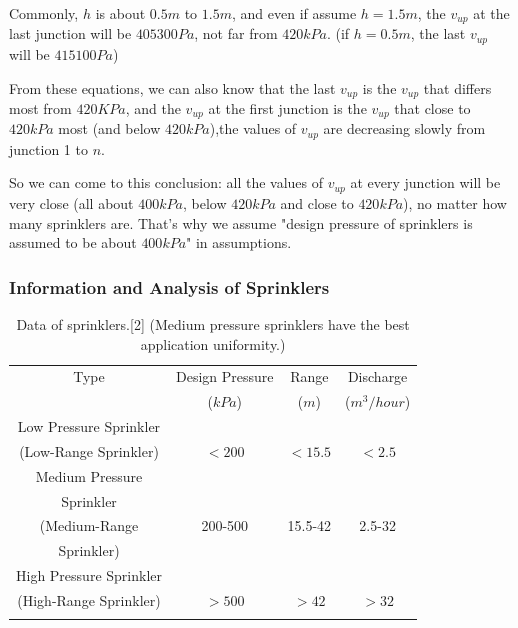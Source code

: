 \documentclass[12pt,a4paper,titlepage]{article}
\begin{document}
Commonly, $h$ is about $0.5m$ to $1.5m$, and even if assume
$h=1.5m$, the $v_{up}$ at the last junction will be $405300Pa$,
not far from $420kPa$. (if $h=0.5m$, the last $v_{up}$ will be
$415100Pa$)

From these equations, we can also know that the last $v_{up}$ is
the $v_{up}$ that differs most from $420KPa$, and the $v_{up}$ at
the first junction is the $v_{up}$ that close to $420kPa$ most
(and below $420kPa$),the values of $v_{up}$ are decreasing slowly
from junction 1 to $n$.

So we can come to this conclusion: all the values of $v_{up}$ at
every junction will be very close (all about $400kPa$, below
$420kPa$ and close to $420kPa$), no matter how many sprinklers
are. That's why we assume "design pressure of sprinklers is
assumed to be about $400 kPa$" in assumptions.

\newpage

\subsubsection{Information and Analysis of Sprinklers}

\begin{table}[!htb]
\centering
\caption{Data of sprinklers.[2] (Medium pressure
sprinklers have the best application uniformity.)}
\begin{tabular}{l|l|l|l}
\hline
\multicolumn{1}{c|}{Type} & \multicolumn{1}{c|}{Design Pressure} & \multicolumn{1}{c|}{Range} & \multicolumn{1}{c}{Discharge} \\
\multicolumn{1}{c|}{} & \multicolumn{1}{c|}{($kPa$)} & \multicolumn{1}{c|}{($m$)} & \multicolumn{1}{c}{($m^3/hour$)} \\
\hline
\multicolumn{1}{c|}{Low Pressure Sprinkler} & \multicolumn{1}{c|}{} & \multicolumn{1}{c|}{} & \multicolumn{1}{c}{} \\
\multicolumn{1}{c|}{(Low-Range Sprinkler)} & \multicolumn{1}{c|}{$<200$} & \multicolumn{1}{c|}{$<15.5$} & \multicolumn{1}{c}{$<2.5$} \\
\hline
\multicolumn{1}{c|}{Medium Pressure } & \multicolumn{1}{c|}{} & \multicolumn{1}{c|}{} & \multicolumn{1}{c}{} \\
\multicolumn{1}{c|}{Sprinkler} & \multicolumn{1}{c|}{} & \multicolumn{1}{c|}{} & \multicolumn{1}{c}{} \\
\multicolumn{1}{c|}{(Medium-Range } & \multicolumn{1}{c|}{200-500} & \multicolumn{1}{c|}{15.5-42} & \multicolumn{1}{c}{2.5-32} \\
\multicolumn{1}{c|}{Sprinkler)} & \multicolumn{1}{c|}{} & \multicolumn{1}{c|}{} & \multicolumn{1}{c}{} \\
\hline
\multicolumn{1}{c|}{High Pressure Sprinkler} & \multicolumn{1}{c|}{} & \multicolumn{1}{c|}{} & \multicolumn{1}{c}{} \\
\multicolumn{1}{c|}{(High-Range Sprinkler)} & \multicolumn{1}{c|}{$>500$} & \multicolumn{1}{c|}{$>42$} & \multicolumn{1}{c}{$>32$} \\
\hline
\multicolumn{1}{l}{} & \multicolumn{1}{l}{} & \multicolumn{1}{l}{} &  \\
\end{tabular}
\end{table}
\end{document}
